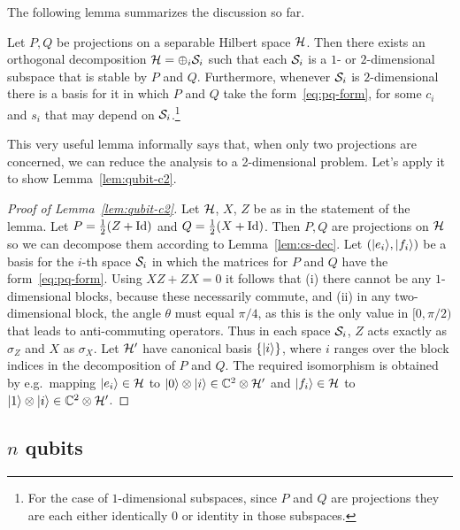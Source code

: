 The following lemma summarizes the discussion so far. 

\begin{lemma}\label{lem:cs-dec}
Let $P,Q$ be projections on a separable Hilbert space $\mathcal{H}$. Then there exists an orthogonal decomposition $\mathcal{H} = \oplus_i \mathcal{S}_i$ such that each $\mathcal{S}_i$ is a $1$- or $2$-dimensional subspace that is stable by $P$ and $Q$. Furthermore, whenever $\mathcal{S}_i$ is $2$-dimensional there is a basis for it in which $P$ and $Q$ take the form~\eqref{eq:pq-form}, for some $c_i$ and $s_i$ that may depend on $\mathcal{S}_i$.\footnote{For the case of $1$-dimensional subspaces, since $P$ and $Q$ are projections they are each either identically $0$ or identity in those subspaces.}
\end{lemma} 

This very useful lemma informally says that, when only two projections are concerned, we can reduce the analysis to a 2-dimensional problem. Let's apply it to show Lemma~\ref{lem:qubit-c2}. 


\begin{proof}[Proof of Lemma~\ref{lem:qubit-c2}]
Let $\mathcal{H}$, $X$, $Z$ be as in the statement of the lemma. Let $P=\frac{1}{2}(Z+\mathop{\rm Id}\nolimits)$ and $Q = \frac{1}{2}(X+\mathop{\rm Id}\nolimits)$. Then $P,Q$ are projections on $\mathcal{H}$ so we can decompose them according to Lemma~\ref{lem:cs-dec}. Let $(|e_i\rangle,|f_i\rangle)$ be a basis for the $i$-th space $\mathcal{S}_i$ in which the matrices for $P$ and $Q$ have the form~\eqref{eq:pq-form}. Using $XZ+ZX=0$ it follows that (i) there cannot be any $1$-dimensional blocks, because these necessarily commute, and (ii) in any two-dimensional block, the angle $\theta$ must equal $\pi/4$, as this is the only value in $[0,\pi/2)$ that leads to anti-commuting operators. Thus in each space $\mathcal{S}_i$, $Z$ acts exactly as $\sigma_Z$ and $X$ as $\sigma_X$. Let $\mathcal{H}'$ have canonical basis $\{|i\rangle\}$, where $i$ ranges over the block indices in the decomposition of $P$ and $Q$. The required isomorphism is obtained by e.g.\ mapping $|e_i\rangle\in \mathcal{H}$ to $|0\rangle \otimes |i\rangle\in \mathbb{C}^2 \otimes \mathcal{H}'$ and $|f_i\rangle\in\mathcal{H}$ to $|1\rangle\otimes |i\rangle\in\mathbb{C}^2\otimes\mathcal{H}'$. 
\end{proof}


\subsection{$n$ qubits}

